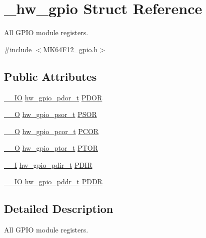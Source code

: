 \hypertarget{struct__hw__gpio}{}\section{\+\_\+hw\+\_\+gpio Struct Reference}
\label{struct__hw__gpio}


All G\+P\+IO module registers.  




{\ttfamily \#include $<$M\+K64\+F12\+\_\+gpio.\+h$>$}

\subsection*{Public Attributes}
\begin{DoxyCompactItemize}
\item 
\hyperlink{core__sc300_8h_aec43007d9998a0a0e01faede4133d6be}{\+\_\+\+\_\+\+IO} \hyperlink{union__hw__gpio__pdor}{hw\+\_\+gpio\+\_\+pdor\+\_\+t} \hyperlink{struct__hw__gpio_a3d25308877e6a5c18654141ad515639f}{P\+D\+OR}
\item 
\hyperlink{core__sc300_8h_a7e25d9380f9ef903923964322e71f2f6}{\+\_\+\+\_\+O} \hyperlink{union__hw__gpio__psor}{hw\+\_\+gpio\+\_\+psor\+\_\+t} \hyperlink{struct__hw__gpio_a8d13ed8da1d03b49b7845067edac7f07}{P\+S\+OR}
\item 
\hyperlink{core__sc300_8h_a7e25d9380f9ef903923964322e71f2f6}{\+\_\+\+\_\+O} \hyperlink{union__hw__gpio__pcor}{hw\+\_\+gpio\+\_\+pcor\+\_\+t} \hyperlink{struct__hw__gpio_ae9511cfe5234bc80b58bddf925a48212}{P\+C\+OR}
\item 
\hyperlink{core__sc300_8h_a7e25d9380f9ef903923964322e71f2f6}{\+\_\+\+\_\+O} \hyperlink{union__hw__gpio__ptor}{hw\+\_\+gpio\+\_\+ptor\+\_\+t} \hyperlink{struct__hw__gpio_ad0492d0354978a3251a02bad5fb8a6e7}{P\+T\+OR}
\item 
\hyperlink{core__sc300_8h_af63697ed9952cc71e1225efe205f6cd3}{\+\_\+\+\_\+I} \hyperlink{union__hw__gpio__pdir}{hw\+\_\+gpio\+\_\+pdir\+\_\+t} \hyperlink{struct__hw__gpio_a199310f790666e9317d2528a05b42b88}{P\+D\+IR}
\item 
\hyperlink{core__sc300_8h_aec43007d9998a0a0e01faede4133d6be}{\+\_\+\+\_\+\+IO} \hyperlink{union__hw__gpio__pddr}{hw\+\_\+gpio\+\_\+pddr\+\_\+t} \hyperlink{struct__hw__gpio_a65ef737933f5ea56596ef09cb1933287}{P\+D\+DR}
\end{DoxyCompactItemize}


\subsection{Detailed Description}
All G\+P\+IO module registers. 

